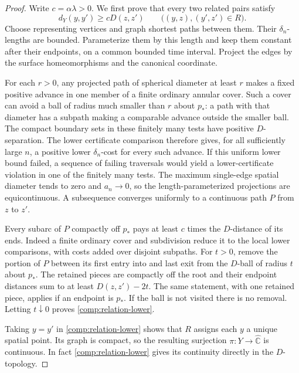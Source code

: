 \documentclass[11pt]{article}
\numberwithin{equation}{section}
\theoremstyle{definition}
\theoremstyle{remark}
\newcommand{\1}{\mathbf 1}
\begin{document}
\begin{proof}
Write $c=\alpha\lambda>0$.  We first prove that every two related
pairs satisfy
\begin{equation}
 \label{comp:relation-lower}
 d_Y(y,y')\ge cD(z,z')
 \qquad\bigl((y,z),(y',z')\in R\bigr).
\end{equation}
Choose representing vertices and graph shortest paths between them.
Their $\delta_n$-lengths are bounded.  Parameterize them by this
length and keep them constant after their endpoints, on a common
bounded time interval.  Project the edges by the surface
homeomorphisms and the canonical coordinate.

For each $r>0$, any projected path of spherical diameter at least
$r$ makes a fixed positive advance in one member of a finite
ordinary annular cover.  Such a cover can avoid a ball of radius
much smaller than $r$ about $p_*$: a path with that diameter has a
subpath making a comparable advance outside the smaller ball.
The compact boundary sets in these finitely many tests have
positive $D$-separation.  The lower certificate comparison therefore
gives, for all sufficiently large $n$, a positive lower
$\delta_n$-cost for every such advance.  If this uniform lower
bound failed, a sequence of failing traversals would yield a
lower-certificate violation in one of the finitely many tests.
The maximum single-edge spatial diameter tends to zero and
$a_n\to0$, so the length-parameterized projections are
equicontinuous.  A subsequence converges uniformly to a continuous
path $P$ from $z$ to $z'$.

Every subarc of $P$ compactly off $p_*$ pays at least $c$ times the
$D$-distance of its ends.  Indeed a finite ordinary cover and
subdivision reduce it to the local lower comparisons, with costs
added over disjoint subpaths.  For $t>0$, remove the portion of $P$
between its first entry into and last exit from the $D$-ball of
radius $t$ about $p_*$.  The retained pieces are compactly off the
root and their endpoint distances sum to at least
$D(z,z')-2t$.  The same statement, with one retained piece, applies
if an endpoint is $p_*$.  If the ball is not visited there is no
removal.  Letting $t\downarrow0$ proves
\eqref{comp:relation-lower}.

Taking $y=y'$ in \eqref{comp:relation-lower} shows that $R$ assigns
each $y$ a unique spatial point.  Its graph is compact, so the
resulting surjection $\pi:Y\to\widehat{\mathbb C}$ is continuous.  In fact
\eqref{comp:relation-lower} gives its continuity directly in the
$D$-topology.


\end{proof}
\end{document}
